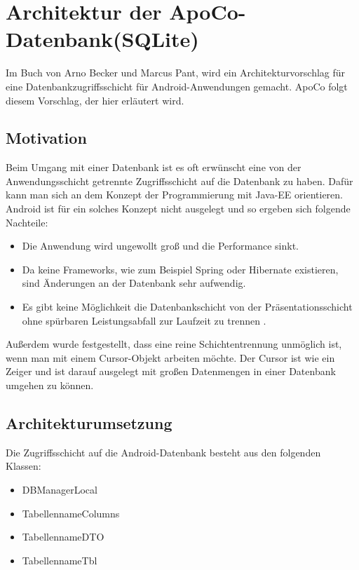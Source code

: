 

\section{Architektur der ApoCo-Datenbank(SQLite)}

Im Buch von Arno Becker und Marcus Pant\cite[S.244]{Android:02}, wird ein Architekturvorschlag f\"ur eine
Datenbankzugriffsschicht f\"ur Android-Anwendungen gemacht.
ApoCo folgt diesem Vorschlag, der hier erl\"autert wird.

\subsection{Motivation}

Beim Umgang mit einer Datenbank ist es oft erw\"unscht eine von der Anwendungsschicht getrennte Zugriffsschicht auf die Datenbank zu haben.
Daf\"ur kann man sich an dem Konzept der Programmierung mit Java-EE orientieren.
Android ist f\"ur ein solches Konzept nicht ausgelegt und so ergeben sich folgende Nachteile:

\begin{itemize}
 
\item Die Anwendung wird ungewollt gro\ss{} und die Performance sinkt.
\item Da keine Frameworks, wie zum Beispiel Spring oder Hibernate existieren, sind \"Anderungen an der Datenbank sehr aufwendig.
\item Es gibt keine M\"oglichkeit die Datenbankschicht von der Pr\"asentationsschicht ohne sp\"urbaren Leistungsabfall zur Laufzeit zu trennen
\cite[S.244]{Android:02}.

\end{itemize}

Au\ss{}erdem wurde festgestellt, dass eine reine Schichtentrennung unm\"oglich ist, 
wenn man mit einem Cursor-Objekt arbeiten m\"ochte.
Der Cursor ist wie ein Zeiger und ist darauf ausgelegt mit gro\ss{}en Datenmengen in einer Datenbank umgehen zu k\"onnen.\\

\subsection{Architekturumsetzung}

Die Zugriffsschicht auf die Android-Datenbank besteht aus den folgenden Klassen:

\begin{itemize}
 \item DBManagerLocal
 \item TabellennameColumns
 \item TabellennameDTO
 \item TabellennameTbl
\end{itemize}

